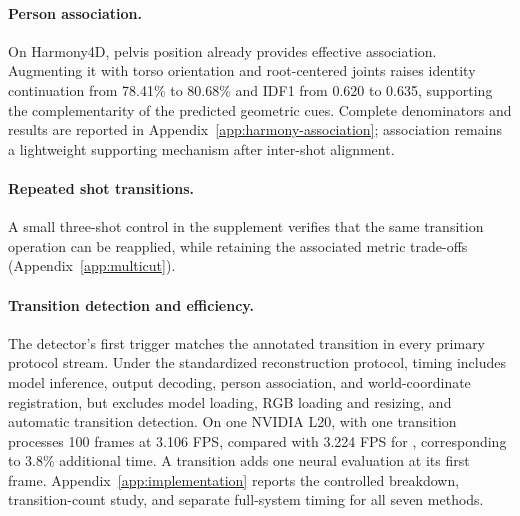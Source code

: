 \paragraph{Person association.}
On Harmony4D, pelvis position already provides effective association.
Augmenting it with torso orientation and root-centered joints raises identity
continuation from 78.41\% to 80.68\% and IDF1 from 0.620 to 0.635, supporting
the complementarity of the predicted geometric cues. Complete denominators
and results are reported in Appendix~\ref{app:harmony-association}; association
remains a lightweight supporting mechanism after inter-shot alignment.

\paragraph{Repeated shot transitions.}
A small three-shot control in the supplement verifies that the same transition
operation can be reapplied, while retaining the associated metric trade-offs
(Appendix~\ref{app:multicut}).

\paragraph{Transition detection and efficiency.}
The detector's first trigger matches the annotated transition in every primary
protocol stream. Under the standardized reconstruction protocol, timing
includes model inference, output decoding, person association, and
world-coordinate registration, but excludes model loading, RGB loading and
resizing, and automatic transition detection. On one NVIDIA L20, \method{}
with one transition processes 100 frames at 3.106 FPS, compared with 3.224 FPS
for \humanthree{}, corresponding to 3.8\% additional time. A transition adds
one neural evaluation at its first frame. Appendix~\ref{app:implementation}
reports the controlled breakdown, transition-count study, and separate
full-system timing for all seven methods.

